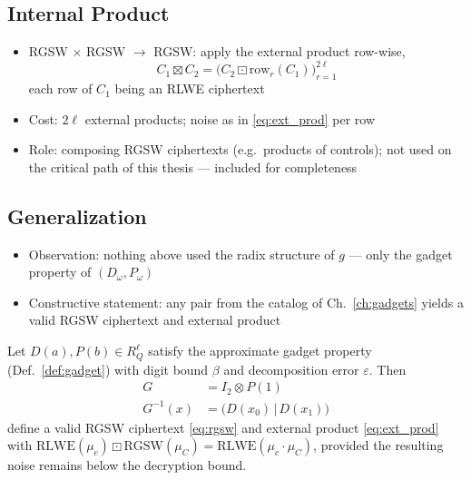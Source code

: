 \subsection{Internal Product}
\begin{itemize}
    \item RGSW $\times$ RGSW $\to$ RGSW: apply the external product row-wise,
          \begin{equation}
              C_1 \boxtimes C_2 = \big(C_2 \boxdot \mathrm{row}_r(C_1)\big)_{r=1}^{2\ell}
          \end{equation}
          each row of $C_1$ being an RLWE ciphertext
    \item Cost: $2\ell$ external products; noise as in \eqref{eq:ext_prod}
          per row
    \item Role: composing RGSW ciphertexts (e.g.\ products of controls);
          not used on the critical path of this thesis --- included for
          completeness %
\end{itemize}

\subsection{Generalization}
\begin{itemize}
    \item Observation: nothing above used the radix structure of $g$ ---
          only the gadget property of $(D_\omega, P_\omega)$
    \item Constructive statement: any pair from the catalog of
          Ch.~\ref{ch:gadgets} yields a valid RGSW ciphertext and external
          product
\end{itemize}

\begin{theorem}
    \label{thm:generalization}
    Let $D(a), P(b) \in R_Q^\ell$ satisfy the approximate gadget property
    (Def.~\ref{def:gadget}) with digit bound $\beta$ and decomposition error
    $\varepsilon$. Then
    \begin{align}
        G &= I_2 \otimes P(1) \label{eq:gen_G}\\
        G^{-1}(x) &= \big(D(x_0) \,\big|\, D(x_1)\big) \label{eq:gen_Ginv}
    \end{align}
    define a valid RGSW ciphertext \eqref{eq:rgsw} and external product
    \eqref{eq:ext_prod} with
    $\mathrm{RLWE}(\mu_c) \boxdot \mathrm{RGSW}(\mu_C)
     = \mathrm{RLWE}(\mu_c \cdot \mu_C)$,
    provided the resulting noise remains below the decryption bound.
\end{theorem}

